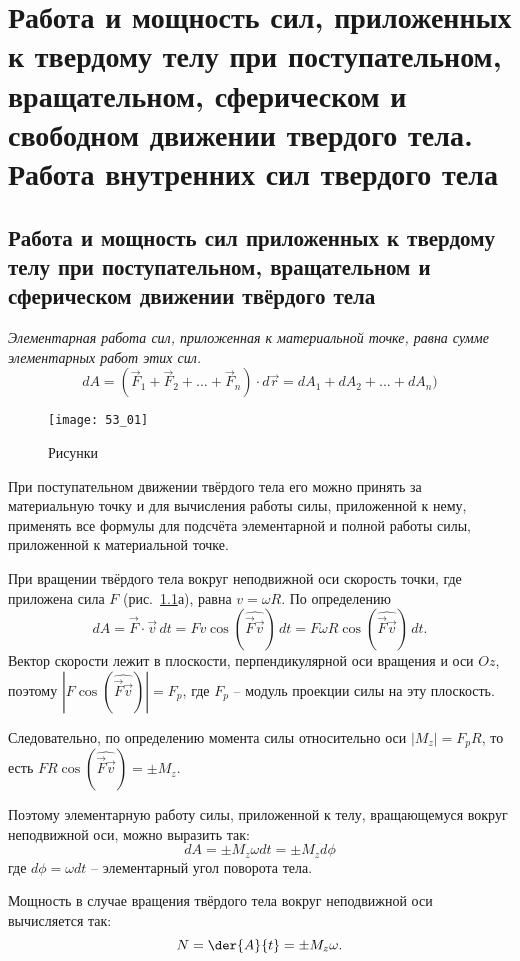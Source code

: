\chapter{Работа и мощность сил, приложенных к твердому телу при поступательном,
вращательном, сферическом и свободном движении твердого тела. Работа
внутренних сил твердого тела}

\section{Работа и мощность сил приложенных к твердому телу при поступательном, 
вращательном и сферическом движении твёрдого тела}

\emph{Элементарная работа сил, приложенная к материальной точке, равна сумме 
элементарных работ этих сил.}
\[ 
	dA = \left( \vec{F}_1 + \vec{F}_2 + ... + \vec{F}_n \right)\cdot d\vec{r} =
	dA_1 + dA_2 + ... + dA_n)
\]

\begin{figure}[h!]
	\center
    \texttt{[image: 53\_01]}
    \caption{Рисунки}
    \label{pic53_01}
\end{figure}

При поступательном движении твёрдого тела его можно принять за материальную 
точку и для вычисления работы силы, приложенной к нему, применять все 
формулы для подсчёта элементарной и полной работы силы, приложенной к 
материальной точке.

При вращении твёрдого тела вокруг неподвижной оси скорость точки, где приложена 
сила \( F \) (рис.~\ref{pic53_01}а), равна \( v = \omega R \). По определению
\[ 
	dA = \vec{F}\cdot\vec{v}\,dt = Fv\cos(\widehat{\vec{F}\vec{v}})\,dt = 
	F\omega R\cos(\widehat{\vec{F}\vec{v}})\,dt.
\]
Вектор скорости лежит в плоскости, перпендикулярной оси вращения и оси \( Oz \), 
поэтому \( |F\cos(\widehat{\vec{F}\vec{v}})| = F_p \), где \( F_p \) -- модуль проекции силы
на эту плоскость. 

Следовательно, по определению момента силы относительно оси 
\( |M_z| = F_p R\), то есть \( FR\cos(\widehat{\vec{F}\vec{v}}) = \pm M_z \).

Поэтому элементарную работу силы, приложенной к телу, вращающемуся вокруг 
неподвижной оси, можно выразить так:
\[
	dA = \pm M_z\omega dt = \pm M_zd\phi
\]
где \( d\phi = \omega dt \) -- элементарный угол поворота тела.

Мощность в случае вращения твёрдого тела вокруг неподвижной оси 
вычисляется так:
\[
	N = \der{A}{t} = \pm M_z\omega.
\]

